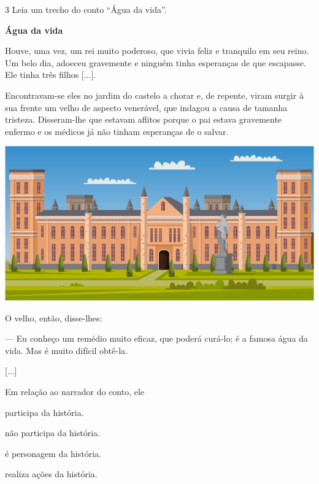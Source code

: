 \num{3} Leia um trecho do conto ``Água da vida''.

\begin{myquote}
\textbf{Água da vida}

Houve, uma vez, um rei muito poderoso, que vivia feliz e tranquilo em
seu reino. Um belo dia, adoeceu gravemente e ninguém tinha esperanças de
que escapasse. Ele tinha três filhos {[}...{]}.

Encontravam-se eles no jardim do castelo a chorar e, de repente, viram
surgir à sua frente um velho de aspecto venerável, que indagou a causa
de tamanha tristeza. Disseram-lhe que estavam aflitos porque o pai
estava gravemente enfermo e os médicos já não tinham esperanças de o
salvar.

\begin{center}
\noindent\includegraphics[width=\textwidth]{./media/image3d.jpeg}
\end{center}

O velho, então, disse-lhes:

--- Eu conheço um remédio muito eficaz, que poderá curá-lo; é a famosa
água da vida. Mas é muito difícil obtê-la.

{[}...{]}

\end{myquote}

Em relação ao narrador do conto, ele

\begin{escolha}[itemsep=-5pt]
\item participa da história.

\item não participa da história.

\item é personagem da história.

\item realiza ações da história.
\end{escolha}

